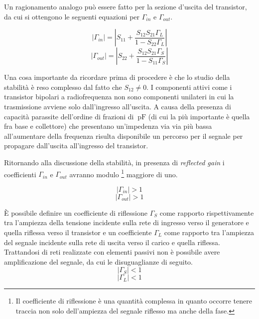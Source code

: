 \documentclass[12pt,oneside]{book}
\begin{document}
Un ragionamento analogo può essere fatto per la sezione d'uscita del transistor, da cui si ottengono le seguenti equazioni per $\Gamma_{in}$ e $\Gamma_{out}$.

\begin{equation}
    \left|\Gamma_{in}\right| = \left|S_{11} + \dfrac{S_{12}S_{21}\Gamma_{L}}{1-S_{22}\Gamma_{L}}\right|
    \label{gamma_in}
\end{equation}
\begin{equation}
    \left|\Gamma_{out}\right| = \left|S_{22} + \dfrac{S_{12}S_{21}\Gamma_{S}}{1-S_{11}\Gamma_{S}}\right|
    \label{gamma_out}
\end{equation}

Una cosa importante da ricordare prima di procedere è che lo studio della stabilità è reso complesso dal fatto che $S_{12} \neq 0$. I componenti attivi come i transistor bipolari a radiofrequenza non sono componenti unilateri in cui la trasmissione avviene solo dall'ingresso all'uscita. A causa della presenza di capacità parassite dell'ordine di frazioni di $\SI{}{\pico\farad}$ (di cui la più importante è quella fra base e collettore) che presentano un'impedenza via via più bassa all'aumentare della frequenza risulta disponibile un percorso per il segnale per propagare dall'uscita all'ingresso del transistor.

Ritornando alla discussione della stabilità, in presenza di \textit{reflected gain} i coefficienti $\Gamma_{in}$ e $\Gamma_{out}$ avranno modulo \footnote{Il coefficiente di riflessione è una quantità complessa in quanto occorre tenere traccia non solo dell'ampiezza del segnale riflesso ma anche della fase.} maggiore di uno.

\begin{equation}
    \left|\Gamma_{in}\right| > 1
\end{equation}
\begin{equation}
    \left|\Gamma_{out}\right| > 1
\end{equation}

È possibile definire un coefficiente di riflessione $\Gamma_{S}$ come rapporto rispettivamente tra l'ampiezza della tensione incidente sulla rete di ingresso verso il generatore e quella riflessa verso il transistor e un coefficiente $\Gamma_{L}$ come rapporto tra l'ampiezza del segnale incidente sulla rete di uscita verso il carico e quella riflessa. Trattandosi di reti realizzate con elementi passivi non è possibile avere amplificazione del segnale, da cui le disuguaglianze di seguito.
\begin{equation}
    \left|\Gamma_{S}\right| < 1
\end{equation}
\begin{equation}
    \left|\Gamma_{L}\right| < 1
\end{equation}
\end{document}
